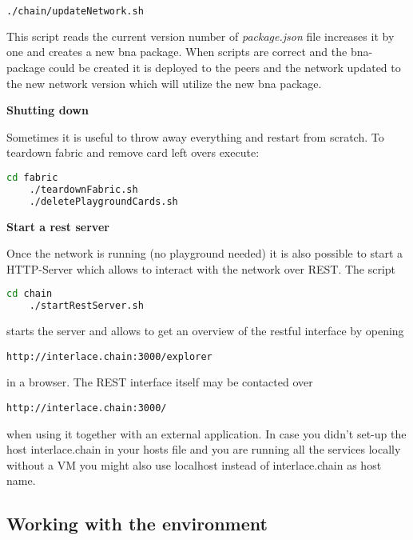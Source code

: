 \begin{lstlisting}[language=bash]
	./chain/updateNetwork.sh
\end{lstlisting}

This script reads the current version number of \textit{package.json} file increases it by one and creates a new bna package. When scripts are correct and the bna-package could be created it is deployed to the peers and the network updated to the new network version which will utilize the new bna package.

\textbf{Shutting down}

Sometimes it is useful to throw away everything and restart from scratch. To teardown fabric and remove card left overs execute:

\begin{lstlisting}[language=bash]
	cd fabric
	./teardownFabric.sh
	./deletePlaygroundCards.sh
\end{lstlisting}

\textbf{Start a rest server}

Once the network is running (no playground needed) it is also possible to start a HTTP-Server which allows to interact with the network over REST. The script

\begin{lstlisting}[language=bash]
	cd chain
	./startRestServer.sh
\end{lstlisting}

starts the server and allows to get an overview of the restful interface by opening

\begin{lstlisting}
http://interlace.chain:3000/explorer
\end{lstlisting}

in a browser. The REST interface itself may be contacted over

\begin{lstlisting}
http://interlace.chain:3000/
\end{lstlisting}

when using it together with an external application. In case you didn't set-up the host interlace.chain in your hosts file and you are running all the services locally without a VM you might also use localhost instead of interlace.chain as host name.

\subsection{Working with the environment}


